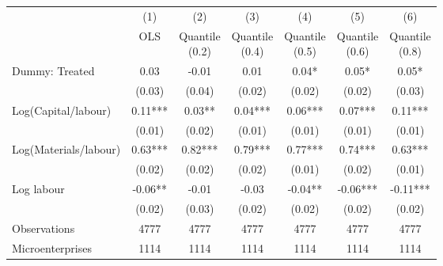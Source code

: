 {
\def\sym#1{\ifmmode^{#1}\else\(^{#1}\)\fi}
\begin{tabular}{l*{6}{c}}
\toprule
                    &\multicolumn{1}{c}{(1)}   &\multicolumn{1}{c}{(2)}   &\multicolumn{1}{c}{(3)}   &\multicolumn{1}{c}{(4)}   &\multicolumn{1}{c}{(5)}   &\multicolumn{1}{c}{(6)}   \\
                    &\specialcell{OLS\\\vphantom{()}}   &\specialcell{Quantile\\(0.2)}   &\specialcell{Quantile\\(0.4)}   &\specialcell{Quantile\\(0.5)}   &\specialcell{Quantile\\(0.6)}   &\specialcell{Quantile\\(0.8)}   \\
\midrule
Dummy: Treated      &        0.03   &       -0.01   &        0.01   &        0.04*  &        0.05*  &        0.05*  \\
                    &      (0.03)   &      (0.04)   &      (0.02)   &      (0.02)   &      (0.02)   &      (0.03)   \\
Log(Capital/labour) &        0.11***&        0.03** &        0.04***&        0.06***&        0.07***&        0.11***\\
                    &      (0.01)   &      (0.02)   &      (0.01)   &      (0.01)   &      (0.01)   &      (0.01)   \\
Log(Materials/labour)&        0.63***&        0.82***&        0.79***&        0.77***&        0.74***&        0.63***\\
                    &      (0.02)   &      (0.02)   &      (0.02)   &      (0.01)   &      (0.02)   &      (0.01)   \\
Log labour          &       -0.06** &       -0.01   &       -0.03   &       -0.04** &       -0.06***&       -0.11***\\
                    &      (0.02)   &      (0.03)   &      (0.02)   &      (0.02)   &      (0.02)   &      (0.02)   \\
\midrule
Observations        &        4777   &        4777   &        4777   &        4777   &        4777   &        4777   \\
Microenterprises    &        1114   &        1114   &        1114   &        1114   &        1114   &        1114   \\
\bottomrule
\end{tabular}
}
